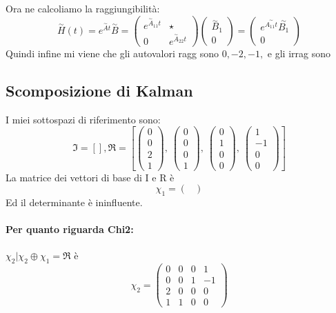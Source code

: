 \documentclass{article}
\begin{document}
Ora ne calcoliamo la raggiungibilità: \[ \overset{\sim}{H}(t) = e^{\overset{\sim}{A}t}\overset{\sim}{B} = \begin{pmatrix} e^{\overset{\sim}{A}_{11}t} &  \star \\ 0 & e^{\overset{\sim}{A}_{22}t} \end{pmatrix} \begin{pmatrix} \overset{\sim}{B}_1 \\ 0 \end{pmatrix} = \begin{pmatrix} e^{\overset{\sim}{A_{11}t}}\overset{\sim}{B_1} \\ 0 \end{pmatrix} \]
Quindi infine mi viene che gli autovalori ragg sono $ 0, -2, -1,  $ e gli irrag sono $  $
\subsection{Scomposizione di Kalman}
I miei sottospazi di riferimento sono:	\[ \mathfrak{I} = \left[ \right], \mathfrak{R} = \left[ \left(\begin{matrix}0\\0\\2\\1\end{matrix}\right), \  \left(\begin{matrix}0\\0\\0\\1\end{matrix}\right), \  \left(\begin{matrix}0\\1\\0\\0\end{matrix}\right), \  \left(\begin{matrix}1\\-1\\0\\0\end{matrix}\right)\right] \]
La matrice dei vettori di base di I e R è \[ \chi_1 =  \left(\begin{matrix}\end{matrix}\right) \]Ed il determinante è ininfluente.
\paragraph{Per quanto riguarda Chi2:} $ \chi_2 | \chi_2 \oplus \chi_1 = \mathfrak{R} $ è \[ \chi_2 = \left(\begin{matrix}0 & 0 & 0 & 1\\0 & 0 & 1 & -1\\2 & 0 & 0 & 0\\1 & 1 & 0 & 0\end{matrix}\right) \]
\end{document}
